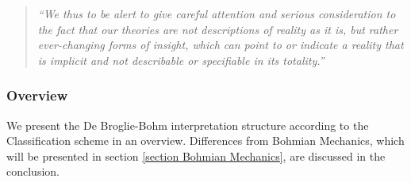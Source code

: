 \documentclass{article}
\begin{document}
\begin{quote}
\textit{``We thus to be alert to give careful attention and serious consideration to the fact that our theories are not descriptions of reality as it is, but rather ever-changing forms of insight, which can point to or indicate a reality that is implicit and not describable or specifiable in its totality.''}
\end{quote}

\newpage

\subsubsection*{Overview} 
 
 We present the De Broglie-Bohm interpretation structure according to the Classification scheme in an overview. Differences from Bohmian Mechanics, which will be presented in section \ref{section Bohmian Mechanics}, are discussed in the conclusion.
 
\end{document}
